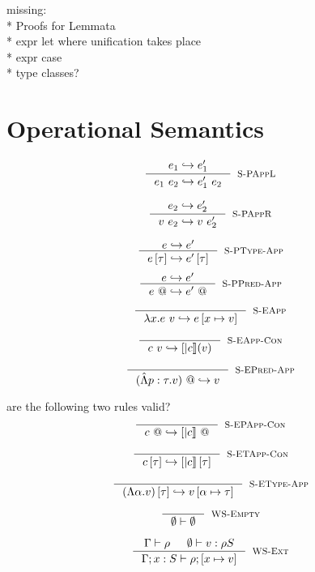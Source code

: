 \documentclass[10pt,a4paper]{article}
\newcommand\highlight[2]{{\setlength\fboxsep{1pt}\colorbox{#1}{#2}}}
\def\NV{\highlight{colorNV}}
\newcommand\rulename[1]{\textsc{#1}}
\begin{document}
\NV{missing:}\\
\NV{* Proofs for Lemmata}\\
\NV{* expr let where unification takes place}\\
\NV{* expr case}\\
\NV{* type classes?}\\


\section*{Operational Semantics}
\hfill{}

$$
\inference{
	\eval{e_1}{e_1'}
}{
	\eval{\eapp{e_1}{e_2}}{\eapp{e_1'}{e_2}}
}[\rulename{S-PAppL}]
$$

$$
\inference{
	\eval{e_2}{e_2'}
}{
	\eval{\eapp{v}{e_2}}{\eapp{v}{e_2'}}
}[\rulename{S-PAppR}]
$$

$$
\inference{
	\eval{e}{e'}
}{
	\eval{\etapp{e}{\tau}}{\etapp{e'}{\tau}}
}[\rulename{S-PType-App}]
$$
$$
\inference{
	\eval{e}{e'}
}{
	\eval{\epapp{e}}{\epapp{e'}}
}[\rulename{S-PPred-App}]
$$

$$
\inference{
}{
	\eval{\eapp{\efun{x}{e}}{v}}{e\sub{x}{v}}
}[\rulename{S-EApp}]
$$

$$
\inference{
}{
	\eval{\eapp{c}{v}}{[|c|](v)}
}[\rulename{S-EApp-Con}]
$$

$$
\inference{
}{
	\eval{\epapp{(\epabs{p}{\tau}{v})}}{v}
}[\rulename{S-EPred-App}]
$$

\NV{are the following two rules valid?}
$$
\inference{
}{
	\eval{\epapp{c}}{\epapp{[|c|]}}
}[\rulename{S-EPApp-Con}]
$$

$$
\inference{
}{
	\eval{\etapp{c}{\tau}}{\etapp{[|c|]}{\tau}}
}[\rulename{S-ETApp-Con}]
$$

$$
\inference{
}{
	\eval{\etapp{(\etabs{\alpha}{v})}{\tau}}{v\sub{\alpha}{\tau}}
}[\rulename{S-EType-App}]
$$



\hfill\fbox{\isWellFormed{\Gamma}{\rho}}

$$
\inference{
}{
	\isWellFormed{\emptyset}{\emptyset}
}[\wsEmp]
$$

$$
\inference{
	\isWellFormed{\Gamma}{\rho} && \hastypeEmp{v}{\rho S}
}{
	\isWellFormed{\Gamma; x:S}{\rho ; \sub{x}{v}}
}[\wsExt]
$$
\end{document}
